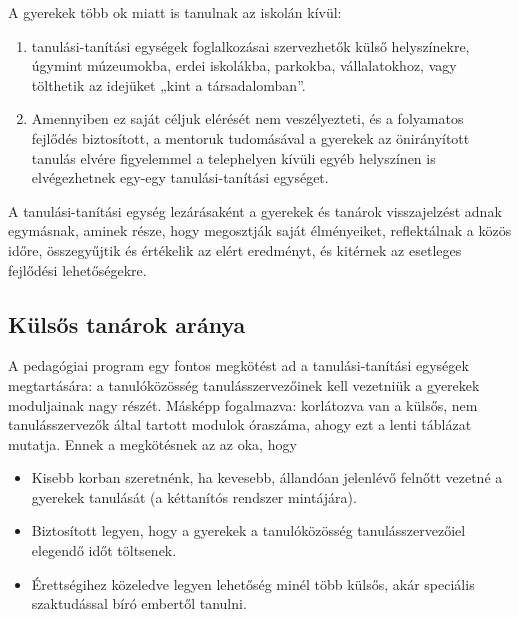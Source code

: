 A gyerekek több ok miatt is tanulnak az iskolán kívül:

\begin{enumerate}
\def\labelenumi{\arabic{enumi}.}
\tightlist
\item
  tanulási-tanítási egységek foglalkozásai szervezhetők külső
  helyszínekre, úgymint múzeumokba, erdei iskolákba, parkokba,
  vállalatokhoz, vagy tölthetik az idejüket „kint a társadalomban''.
\item
  Amennyiben ez saját céljuk elérését nem veszélyezteti, és a folyamatos
  fejlődés biztosított, a mentoruk tudomásával a gyerekek az
  önirányított tanulás elvére figyelemmel a telephelyen kívüli egyéb
  helyszínen is elvégezhetnek egy-egy tanulási-tanítási egységet.
\end{enumerate}

A tanulási-tanítási egység lezárásaként a gyerekek és tanárok
visszajelzést adnak egymásnak, aminek része, hogy megosztják saját
élményeiket, reflektálnak a közös időre, összegyűjtik és értékelik az
elért eredményt, és kitérnek az esetleges fejlődési lehetőségekre.

\hypertarget{kulsos-tanarok-aranya}{%
\subsection{Külsős tanárok aránya}\label{kulsos-tanarok-aranya}}

A pedagógiai program egy fontos megkötést ad a tanulási-tanítási
egységek megtartására: a tanulóközösség tanulásszervezőinek kell
vezetniük a gyerekek moduljainak nagy részét.  Másképp fogalmazva:
korlátozva van a külsős, nem tanulásszervezők által tartott modulok
óraszáma, ahogy ezt a lenti táblázat mutatja. Ennek a megkötésnek az az
oka, hogy

\begin{itemize}
\tightlist
\item
  Kisebb korban szeretnénk, ha kevesebb, állandóan jelenlévő felnőtt
  vezetné a gyerekek tanulását (a kéttanítós rendszer mintájára).
\item
  Biztosított legyen, hogy a gyerekek a tanulóközösség
  tanulásszervezőiel elegendő időt töltsenek.
\item
  Érettségihez közeledve legyen lehetőség minél több külsős, akár\break
  speciális szaktudással bíró embertől tanulni.
\end{itemize}


